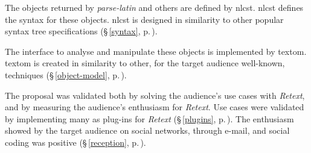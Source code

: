 The objects returned by \emph{parse-latin} and others are defined by
  \acrshort{nlcst}. \acrshort{nlcst} defines the syntax for these objects.
  \acrshort{nlcst} is designed in similarity to other popular syntax tree
  specifications (§\,\ref{syntax}, p.\,\pageref{syntax}).

The interface to analyse and manipulate these objects is implemented by
  \gls{textom}. \gls{textom} is created in similarity to other, for the target
  audience well-known, techniques
  (§\,\ref{object-model}, p.\,\pageref{object-model}).

The proposal was validated both by solving the audience's use cases with
  \emph{Retext}, and by measuring the audience's enthusiasm for \emph{Retext}.
Use cases were validated by implementing many as plug-ins for
  \emph{Retext} (§\,\ref{plugins}, p.\,\pageref{plugins}).
The enthusiasm showed by the target audience on social networks, through
  e-mail, and social coding was positive
  (§\,\ref{reception}, p.\,\pageref{reception}).

\endgroup
